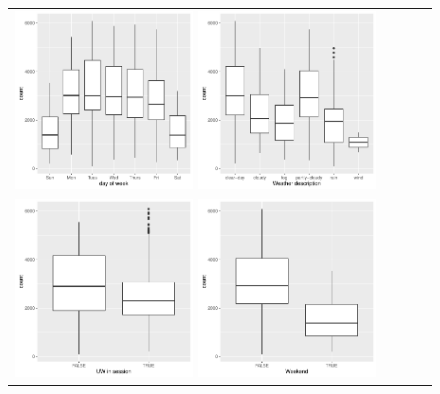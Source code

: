 \documentclass [11pt, proquest] {uwthesis}[2015/03/03]
\begin{document}
\begin{figure}
\vspace{-40pt}
\begin{tabular}{ll}
\includegraphics[width=0.45\textwidth]{figures/dow_cat}
\includegraphics[width=0.45\textwidth]{figures/weather_cat.pdf}\\
\includegraphics[width=0.45\textwidth]{figures/uw_cat}
\includegraphics[width=0.45\textwidth]{figures/wknd_cat}\\

\end{tabular}
\end{figure}
\end{document}
